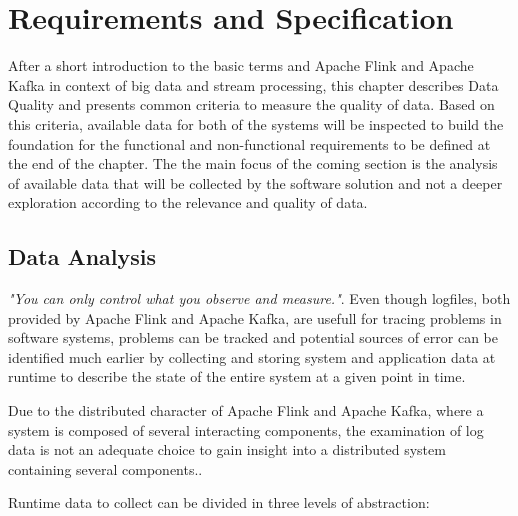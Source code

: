 \chapter{Requirements and Specification}

After a short introduction to the basic terms and Apache Flink and Apache Kafka in
context of big data and stream processing, this chapter describes Data Quality and
presents common criteria to measure the quality of data. Based on this criteria, available data
for both of the systems will be inspected to build the foundation for the functional
and non-functional requirements to be defined at the end of the chapter. The the main focus
of the coming section is the analysis of available data that will be collected by the software
solution and not a deeper exploration according to the relevance and quality of data.


\section{Data Analysis}

\textit{"You can only control what you observe and measure."}\cite{Ebert07}. Even though logfiles, both
provided by Apache Flink and Apache Kafka, are usefull for tracing problems in software
systems, problems can be tracked and potential sources of error can be identified much
earlier by collecting and storing system and application data at runtime to describe the
state of the entire system at a given point in time.

Due to the distributed character of Apache Flink and Apache Kafka, where a system is
composed of several interacting components, the examination of log data is not an
adequate choice to gain insight into a distributed system containing several components.\cite{VanL14}.

Runtime data to collect can be divided in three levels of abstraction:

